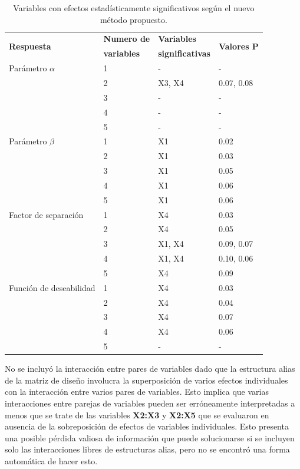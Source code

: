 \begin{table}[H]
    \centering\footnotesize
    \begin{tabular}{@{}llll@{}}\toprule
        \multirow{2}{*}{\textbf{Respuesta}} & \textbf{Numero de} & \textbf{Variables} & \multirow{2}{*}{\textbf{Valores P}} \\
        &\textbf{variables} &\textbf{significativas}\\\midrule
        Parámetro $\alpha$ & 1 & - & -\\
                           & 2 & X3, X4 & 0.07, 0.08\\
                           & 3 & - & -\\
                           & 4 & - & - \\
                           & 5 & - & - \\\midrule
        Parámetro $\beta$  & 1 & X1 & 0.02\\
                           & 2 & X1 & 0.03\\
                           & 3 & X1 & 0.05\\
                           & 4 & X1 & 0.06\\
                           & 5 & X1 & 0.06 \\\midrule
        Factor de separación & 1 & X4 & 0.03\\
                             & 2 & X4 & 0.05\\
                             & 3 & X1, X4 & 0.09, 0.07\\
                             & 4 & X1, X4 & 0.10, 0.06\\
                             & 5 & X4 & 0.09\\\midrule
        Función de deseabilidad & 1 & X4 & 0.03\\
                                & 2 & X4 & 0.04\\
                                & 3 & X4 & 0.07\\
                                & 4 & X4 & 0.06\\
                                & 5 & - & - \\\bottomrule
    \end{tabular}
    \caption[Variables con efectos estadísticamente significativos.]{Variables con efectos estadísticamente significativos según el nuevo método propuesto.}
    \label{tab:paredesFrF2-2}
\end{table}
No se incluyó la interacción entre pares de variables dado que la estructura alias de la matriz de diseño involucra la superposición de varios efectos individuales con la interacción entre varios pares de variables. Esto implica que varias interacciones entre parejas de variables pueden ser erróneamente interpretadas a menos que se trate de las variables \textbf{X2:X3} y \textbf{X2:X5} que se evaluaron en ausencia de la sobreposición de efectos de variables individuales. Esto presenta una posible pérdida valiosa de información que puede solucionarse si se incluyen solo las interacciones libres de estructuras alias, pero no se encontró una forma automática de hacer esto.

